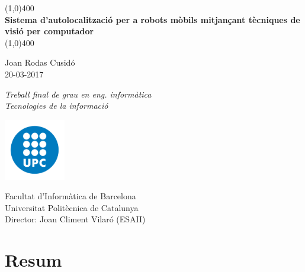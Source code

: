 \documentclass[a4paper,12pt]{report}
\begin{document}

	\begin{titlepage}
		\begin{center}
			\vspace*{1cm}

			\line(1,0){400}\\
			\vspace{0.3cm}
			\Huge
			\textbf{Sistema d'autolocalització per a robots mòbils mitjançant tècniques de visió per computador}\\
			\line(1,0){400}

			\vspace{1.0cm}
			\Large
			Joan Rodas Cusidó\\
			20-03-2017

			\vfill
			\LARGE
			\textit{Treball final de grau en eng. informàtica\\
			Tecnologies de la informació}\\

			\vspace{3cm}

			\includegraphics[width=0.2\textwidth]{images/logo}
			
			\vspace{0.5cm}

			\Large
			Facultat d'Informàtica de Barcelona\\
			Universitat Politècnica de Catalunya\\
			Director: Joan Climent Vilaró (ESAII)
		\end{center}
	\end{titlepage}

	\restoregeometry
	\setcounter{page}{2}

	\chapter*{Resum}
	
\end{document}
